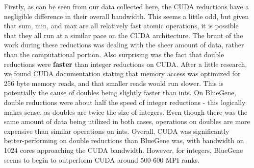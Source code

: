 \documentclass[12pt]{article}
\begin{document}
Firstly, as can be seen from our data collected here, the CUDA reductions have a negligible difference in their overall bandwidth. This seems a little odd, but given that sum, min, and max are all relatively fast atomic operations, it is possible that they all run at a similar pace on the CUDA architecture. The brunt of the work during these reductions was dealing with the sheer amount of data, rather than the computational portion. Also surprising was the fact that double reductions were {\bf faster} than integer reductions on CUDA. After a little research, we found CUDA documentation stating that memory access was optimized for 256 byte memory reads, and that smaller reads would run slower. This is potentially the cause of doubles being slightly faster than ints. On BlueGene, double reductions were about half the speed of integer reductions - this logically makes sense, as doubles are twice the size of integers. Even though there was the same amount of data being utilized in both cases, operations on doubles are more expensive than similar operations on ints. Overall, CUDA was significantly better-performing on double reductions than BlueGene was, with bandwidth on 1024 cores approaching the CUDA bandwidth. However, for integers, BlueGene seems to begin to outperform CUDA around 500-600 MPI ranks.  
\end{document}

